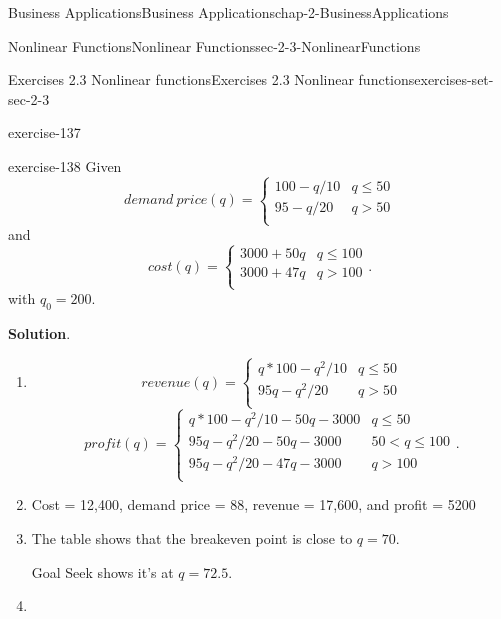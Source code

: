 \documentclass[oneside,10pt,]{book}
\numberwithin{equation}{section}
\newcommand{\lt}{<}
\newcommand{\gt}{>}
\begin{document}
\begin{chapterptx}{Business Applications}{}{Business Applications}{}{}{chap-2-BusinessApplications}
\begin{sectionptx}{Nonlinear Functions}{}{Nonlinear Functions}{}{}{sec-2-3-NonlinearFunctions}
\begin{exercises-subsection-numberless}{Exercises 2.3 Nonlinear functions}{}{Exercises 2.3 Nonlinear functions}{}{}{exercises-set-sec-2-3}
\begin{exercisegroup}
\begin{divisionexerciseeg}{22}{}{}{exercise-137}
\end{divisionexerciseeg}%
\begin{divisionexerciseeg}{23}{}{}{exercise-138}%
\hypertarget{p-888}{}%
Given%
%
\begin{equation*}
demand\ price(q)=\begin{cases}
100-q/10&q \le 50\\
95-q/20&q \gt 50\\
\end{cases}
\end{equation*}
\hypertarget{p-889}{}%
and%
%
\begin{equation*}
cost(q)=\begin{cases}
3000+50q&q \le 100\\
3000+47q&q \gt 100\\
\end{cases}.
\end{equation*}
\hypertarget{p-890}{}%
with \(q_0=200\).%
\par\smallskip%
\noindent\textbf{Solution}.\hypertarget{solution-67}{}\quad%
\leavevmode%
\begin{enumerate}[label=(\alph*)]
\item\hypertarget{li-272}{}%
\begin{equation*}
revenue(q)=\begin{cases}
q*100-q^2/10&q \le 50\\
95q-q^2/20&q \gt 50\\
\end{cases}
\end{equation*}
%
\begin{equation*}
profit(q)=\begin{cases}
q*100-q^2/10-50q-3000&q \le 50\\
95q-q^2/20-50q-3000&50 \lt q \le 100\\
95q-q^2/20-47q-3000&q \gt 100\\
\end{cases}.
\end{equation*}
%
\item\hypertarget{li-273}{}\hypertarget{p-891}{}%
Cost = \textdollar{}12,400, demand price = \textdollar{}88, revenue = \textdollar{}17,600, and profit = \textdollar{}5200%
\item\hypertarget{li-274}{}\hypertarget{p-892}{}%
The table shows that the breakeven point is close to \(q = 70\).%
\par
\hypertarget{p-893}{}%
Goal Seek shows it’s at \(q=72.5\).%
\item\hypertarget{li-275}{}\leavevmode%

\end{enumerate}
\end{divisionexerciseeg}
\end{exercisegroup}
\end{exercises-subsection-numberless}
\end{sectionptx}
\end{chapterptx}
\end{document}
